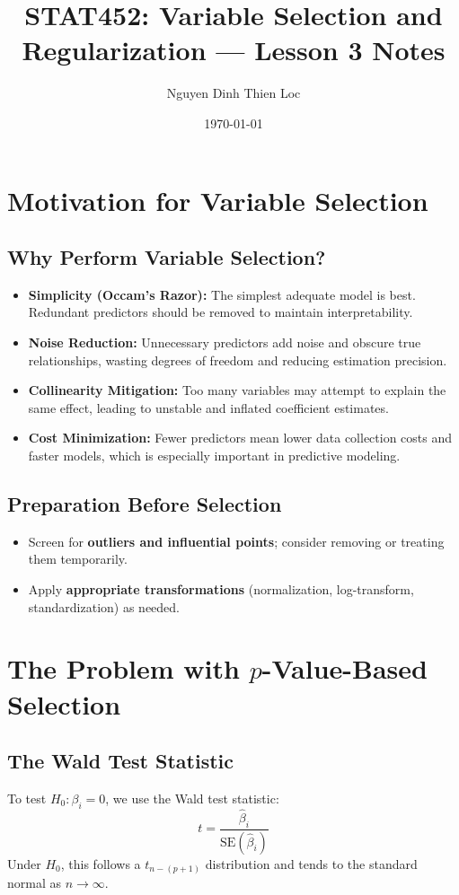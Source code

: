 \documentclass{article}
\title{STAT452: Variable Selection and Regularization --- Lesson 3 Notes}
\author{Nguyen Dinh Thien Loc}
\date{\today}
\begin{document}
\maketitle

\section{Motivation for Variable Selection}

\subsection{Why Perform Variable Selection?}
\begin{itemize}
    \item \textbf{Simplicity (Occam's Razor):} The simplest adequate model is best. Redundant predictors should be removed to maintain interpretability.
    \item \textbf{Noise Reduction:} Unnecessary predictors add noise and obscure true relationships, wasting degrees of freedom and reducing estimation precision.
    \item \textbf{Collinearity Mitigation:} Too many variables may attempt to explain the same effect, leading to unstable and inflated coefficient estimates.
    \item \textbf{Cost Minimization:} Fewer predictors mean lower data collection costs and faster models, which is especially important in predictive modeling.
\end{itemize}

\subsection{Preparation Before Selection}
\begin{itemize}
    \item Screen for \textbf{outliers and influential points}; consider removing or treating them temporarily.
    \item Apply \textbf{appropriate transformations} (normalization, log-transform, standardization) as needed.
\end{itemize}

\section{The Problem with $p$-Value-Based Selection}

\subsection{The Wald Test Statistic}
To test $H_0: \beta_i = 0$, we use the Wald test statistic:
$$t = \frac{\hat{\beta}_i}{\text{SE}(\hat{\beta}_i)}$$
Under $H_0$, this follows a $t_{n-(p+1)}$ distribution and tends to the standard normal as $n \to \infty$.
\end{document}

